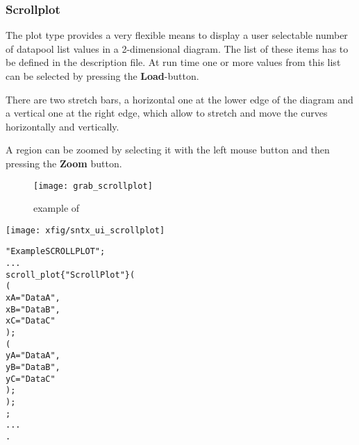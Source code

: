 \subsubsection{Scrollplot}
\label{sec:uiscrollplot}
The plot type
\SCROLLPLOT{} provides a very flexible means to display
a user selectable number of datapool list values
in a 2-dimensional diagram. The list of these items
has to be defined in the description file. At run time one or more values from
this list can be selected by pressing the {\bfseries Load}-button.

There are two stretch bars, a horizontal one at the lower edge of the diagram and
a vertical one at the right edge, which allow to stretch and move the curves 
horizontally and vertically.

A region can be zoomed by selecting it with the left mouse button and then
pressing the {\bfseries Zoom} button.
\begin{figure}\label{fig:scrollplot}
   \begin{center}
      \texttt{[image: grab\_scrollplot]}
   \end{center}
\caption{example of \SCROLLPLOT}
\end{figure}
\vspace{1cm}

\texttt{[image: xfig/sntx\_ui\_scrollplot]}
\vspace{1cm}


\begin{boxedminipage}[t]{\linewidth}
\begin{alltt}
\DESCRIPTION "Example SCROLLPLOT";
  ...
\UIMANAGER
  \SCROLLPLOT
    scroll_plot\{ "Scroll Plot" \} (
      \XAXIS (
        xA = "Data A",
        xB = "Data B",
        xC = "Data C"
      );
      \YAXIS (
        yA = "Data A",
        yB = "Data B",
        yC = "Data C"
      );
    );
\END \UIMANAGER;
  ...
\END.
\end{alltt}
\end{boxedminipage}

